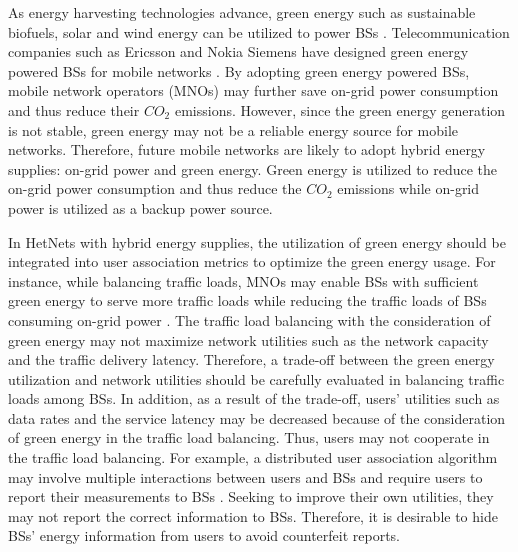 \documentclass[journal]{IEEEtran}
\theoremstyle{definition}
\begin{document}
As energy harvesting technologies advance, green energy such as sustainable biofuels, solar and wind energy can be utilized to power BSs  \cite{Han:2014:PMN}. Telecommunication companies such as Ericsson and Nokia Siemens have designed green energy powered BSs for mobile networks \cite{Ericson:2007:SEU}. By adopting green energy powered BSs, mobile network operators (MNOs) may further save on-grid power consumption and thus reduce their $CO_{2}$ emissions. However, since the green energy generation is not stable, green energy may not be a reliable energy source for mobile networks. Therefore, future mobile networks are likely to adopt hybrid energy supplies: on-grid power and green energy. Green energy is utilized to reduce the on-grid power consumption and thus reduce the $CO_{2}$ emissions while on-grid power is utilized as a backup power source.

In HetNets with hybrid energy supplies, the utilization of green energy should be integrated into user association metrics to optimize the green energy usage. For instance, while balancing traffic loads, MNOs may enable BSs with sufficient green energy to serve more traffic loads while reducing the traffic loads of BSs consuming on-grid power \cite{Han:2013:OOG}. The traffic load balancing with the consideration of green energy may not maximize network utilities such as the network capacity and the traffic delivery latency. Therefore, a trade-off between the green energy utilization and network utilities should be carefully evaluated in balancing traffic loads among BSs. In addition, as a result of the trade-off, users' utilities such as data rates and the service latency may be decreased because of the consideration of green energy in the traffic load balancing. Thus, users may not cooperate in the traffic load balancing. For example, a distributed user association algorithm may involve multiple interactions between users and BSs and require users to report their measurements to BSs \cite{Ye:2013:UAL,Han:2013:GALA}. Seeking to improve their own utilities, they may not report the correct information to BSs. Therefore, it is desirable to hide BSs' energy information from users to avoid counterfeit reports.
\end{document}
